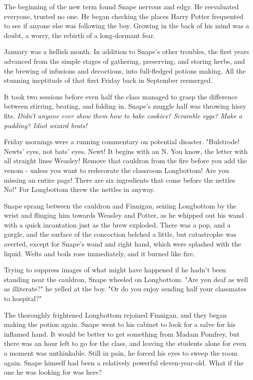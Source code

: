 The beginning of the new term found Snape nervous and edgy. He reevaluated everyone, trusted no one. He began checking the places Harry Potter frequented to see if anyone else was following the boy. Growing in the back of his mind was a doubt, a worry, the rebirth of a long-dormant fear.

January was a hellish month. In addition to Snape's other troubles, the first years advanced from the simple stages of gathering, preserving, and storing herbs, and the brewing of infusions and decoctions, into full-fledged potions making. All the stunning ineptitude of that first Friday back in September reemerged.

It took two sessions before even half the class managed to grasp the difference between stirring, beating, and folding in. Snape's muggle half was throwing hissy fits. \emph{Didn't anyone ever show them how to bake cookies? Scramble eggs? Make a pudding? Idiot wizard brats!}

Friday mornings were a running commentary on potential disaster. "Bulstrode! Newts' eyes, not bats' eyes. Newt! It begins with an N. You know, the letter with all straight lines{\el} Weasley! Remove that cauldron from the fire before you add the venom - unless you want to redecorate the classroom{\el} Longbottom! Are you missing an entire page! There are six ingredients that come before the nettles{\el} No!" For Longbottom threw the nettles in anyway.

Snape sprang between the cauldron and Finnigan, seizing Longbottom by the wrist and flinging him towards Weasley and Potter, as he whipped out his wand with a quick incantation just as the brew exploded. There was a pop, and a gurgle, and the surface of the concoction belched a little, but catastrophe was averted, except for Snape's wand and right hand, which were splashed with the liquid. Welts and boils rose immediately, and it burned like fire.

Trying to suppress images of what might have happened if he hadn't been standing near the cauldron, Snape wheeled on Longbottom. "Are you deaf as well as illiterate?" he yelled at the boy. "Or do you enjoy sending half your classmates to hospital?"

The thoroughly frightened Longbottom rejoined Finnigan, and they began making the potion again. Snape went to his cabinet to look for a salve for his inflamed hand. It would be better to get something from Madam Pomfrey, but there was an hour left to go for the class, and leaving the students alone for even a moment was unthinkable. Still in pain, he forced his eyes to sweep the room again. Snape himself had been a relatively powerful eleven-year-old. What if the one he was looking for was here?

